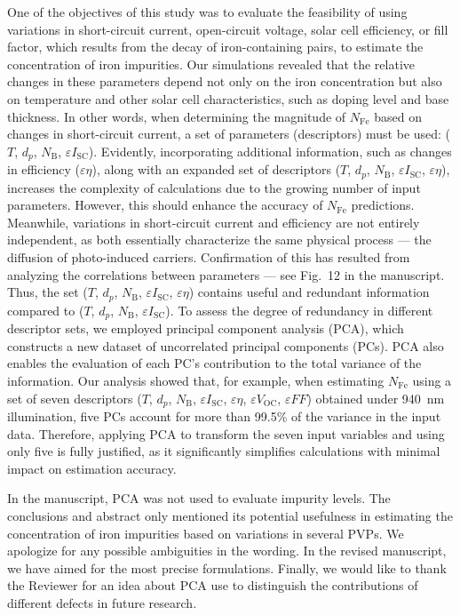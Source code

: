 \documentclass[a4paper,fleqn]{cas-sc}
\begin{document}
One of the objectives of this study was to evaluate the feasibility of using variations
in short-circuit current, open-circuit voltage, solar cell efficiency, or fill factor,
which results from the decay of iron-containing pairs, to estimate the concentration of iron impurities.
Our simulations revealed that the relative changes in these parameters depend
not only on the iron concentration but also on temperature and
other solar cell characteristics, such as doping level and base thickness.
In other words, when determining the magnitude of $N_\mathrm{Fe}$ based on changes in short-circuit current,
a set of parameters (descriptors) must be used: ($T$, $d_p$, $N_\mathrm{B}$, $\varepsilon I_\mathrm{SC}$).
Evidently, incorporating additional information, such as changes in efficiency ($\varepsilon \eta$), along with an expanded
set of descriptors ($T$, $d_p$, $N_\mathrm{B}$, $\varepsilon I_\mathrm{SC}$, $\varepsilon \eta$),
increases the complexity of calculations due to the growing number of input parameters.
However, this should enhance the accuracy of $N_\mathrm{Fe}$ predictions.
Meanwhile, variations in short-circuit current and efficiency are not entirely independent,
as both essentially characterize the same physical process --- the diffusion of photo-induced carriers.
Confirmation of this has resulted from analyzing the correlations between parameters --- see Fig.~12 in the manuscript.
Thus, the set ($T$, $d_p$, $N_\mathrm{B}$, $\varepsilon I_\mathrm{SC}$, $\varepsilon \eta$)
contains useful and redundant information compared to ($T$, $d_p$, $N_\mathrm{B}$, $\varepsilon I_\mathrm{SC}$).
To assess the degree of redundancy in different descriptor sets, we employed principal component analysis (PCA),
which constructs a new dataset of uncorrelated principal components (PCs).
PCA also enables the evaluation of each PC’s contribution to the total variance of the information.
Our analysis showed that, for example, when estimating $N_\mathrm{Fe}$ using a set of
seven descriptors ($T$, $d_p$, $N_\mathrm{B}$, $\varepsilon I_\mathrm{SC}$, $\varepsilon \eta$, $\varepsilon V_\mathrm{OC}$, $\varepsilon F\!F$)
obtained under 940~nm illumination, five PCs account for more than 99.5\% of the variance in the input data.
Therefore, applying PCA to transform the seven input variables and using only five is fully justified,
as it significantly simplifies calculations with minimal impact on estimation accuracy.

In the manuscript, PCA was not used to evaluate impurity levels.
The conclusions and abstract only mentioned its potential usefulness in estimating the concentration of iron impurities
based on variations in several PVPs.
We apologize for any possible ambiguities in the wording.
In the revised manuscript, we have aimed for the most precise formulations.
Finally, we would like to thank the Reviewer for an idea about PCA use to distinguish the contributions of different defects in future research.
\end{document}
